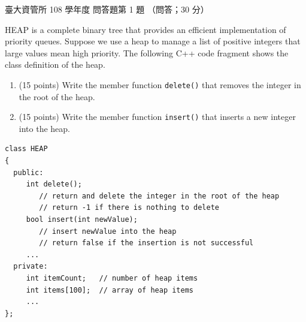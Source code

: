 \begin{pastexam}[label={px:ntu-108-im-it-01}]{臺大資管所 108 學年度 問答題第 1 題}
（問答；30 分）

HEAP is a complete binary tree that provides an efficient implementation of priority queues.
Suppose we use a heap to manage a list of positive integers that large values mean high priority.
The following C++ code fragment shows the class definition of the heap.
\begin{enumerate}[label=(\alph*)]
\item (15 points) Write the member function \texttt{delete()} that removes the integer in the root
of the heap.
\item (15 points) Write the member function \texttt{insert()} that inserts a new integer into the
heap.
\end{enumerate}
\begin{verbatim}
class HEAP
{
  public:
     int delete();
        // return and delete the integer in the root of the heap
        // return -1 if there is nothing to delete
     bool insert(int newValue);
        // insert newValue into the heap
        // return false if the insertion is not successful
     ...
  private:
     int itemCount;   // number of heap items
     int items[100];  // array of heap items
     ...
};
\end{verbatim}
\end{pastexam}

